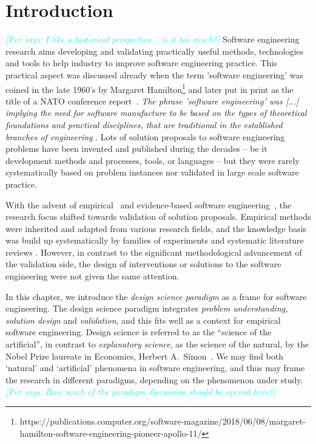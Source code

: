 \documentclass[graybox]{svmult}
\newcommand{\per}[1]{\textcolor{cyan}{{\it [Per says: #1]}}}
\newcommand{\per}[1]{}
\begin{document}
\section{Introduction}
\label{sec:intro}

\per{I like a historical perspective -- is it too much?}
Software engineering research aims developing and validating practically useful methods, technologies and tools to help industry to improve software engineering practice. This practical aspect was discussed already when the term 'software engineering' was coined in the late 1960's by Margaret Hamilton\footnote{https://publications.computer.org/software-magazine/2018/06/08/margaret-hamilton-software-engineering-pioneer-apollo-11/} and later put in print as the title of a NATO conference report~\cite{Nato1968}. \emph{The phrase 'software engineering' was [...] implying the need for software manufacture to be based on the types of theoretical foundations and practical disciplines, that are traditional in the established branches of engineering} \cite[p13]{Nato1968}. Lots of solution proposals to software engineering problems have been invented and published during the decades -- be it development methods and processes, tools, or languages -- but they were rarely systematically based on problem instances nor validated in large scale software practice.

With the advent of empirical~\cite{Basili86} and evidence-based software engineering~\cite{Kitchenham04}, the research focus shifted towards validation of solution proposals. Empirical methods were inherited and adapted from various research fields, and the knowledge basis was build up systematically by families of experiments \cite{Basili99} and systematic literature reviews \cite{Kitchenham15}. However, in contrast to the significant methodological advancement of the validation side, the design of interventions or solutions to the software engineering were not given the same attention. 

In this chapter, we introduce the \emph{design science paradigm} as a frame for software engineering. The design science paradigm integrates \emph{problem understanding, solution design} and \emph{validation}, and this fits well as a context for empirical software engineering. Design science is referred to as the ``science of the artificial'', in contrast to \emph{explanatory science}, as the science of the natural, by the Nobel Prize laureate in Economics, Herbert A.\ Simon~\cite{Simons69}. We may find both `natural' and `artificial' phenomena in software engineering, and thus may frame the research in different paradigms, depending on the phenomenon under study. \per{How much of the paradigm discussion should be opened here?}
\end{document}
